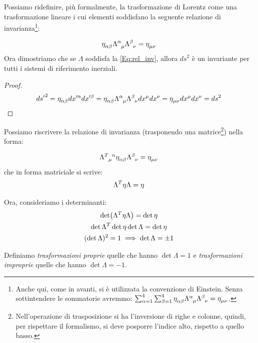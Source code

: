 Possiamo ridefinire, più formalmente, la trasformazione di Lorentz come una trasformazione lineare i cui elementi soddisfano la seguente relazione di invarianza\footnote{Anche qui, come in avanti, si è utilizzata la convenzione di Einstein. Senza sottintendere le sommatorie avremmo: $\sum_{\alpha=1}^{4}\sum_{\beta=1}^{4}\eta\indices{_{\alpha \beta}}\Lambda\indices{^\alpha_\mu}\Lambda\indices{^\beta_\nu}=\eta\indices{_{\mu \nu}}$.}:

\begin{equation}\label{Eq:rel_inv}
\eta\indices{_{\alpha \beta}}\Lambda\indices{^\alpha_\mu}\Lambda\indices{^\beta_\nu}=\eta\indices{_{\mu \nu}}
\end{equation}
Ora dimostriamo che se $\Lambda$ soddisfa la \eqref{Eq:rel_inv}, allora ${ds}^2$ è un invariante per tutti i sistemi di riferimento inerziali.

\begin{proof}
\begin{equation*}
    {ds'}^2=\eta\indices{_{\alpha \beta}}dx'^\alpha dx'^\beta=\eta\indices{_{\alpha \beta}}\Lambda\indices{^\alpha_\mu}\Lambda\indices{^\beta_\nu}dx^\mu dx^\nu=\eta\indices{_{\mu \nu}}dx^\mu dx^\nu={ds}^2
\end{equation*}
\end{proof}


Possiamo riscrivere la relazione di invarianza (trasponendo una matrice\footnote{Nell'operazione di trasposizione si ha l'inversione di righe e colonne, quindi, per rispettare il formalismo, si deve posporre l'indice alto, rispetto a quello basso.}) nella forma:

\begin{equation}
\Lambda\indices{^T_\mu^\alpha}\eta\indices{_{\alpha \beta}}\Lambda\indices{^\beta_\nu}=\eta\indices{_{\mu \nu}}
\end{equation}
che in forma matriciale si scrive:
\begin{equation}
\Lambda\indices{^T}\eta\Lambda=\eta
\end{equation}

Ora, consideriamo i determinanti:
\begin{gather*}
    \det(\Lambda\indices{^T}\eta\Lambda)=\det\eta   \\
\det\Lambda\indices{^T}\det\eta\det\Lambda =\det\eta \\
(\det\Lambda)^2=1\implies \det\Lambda=\pm1
\end{gather*}

Definiamo \textit{trasformazioni proprie} quelle che hanno $\det\Lambda=1$ e \textit{trasformazioni improprie} quelle che hanno $\det\Lambda=-1$.

